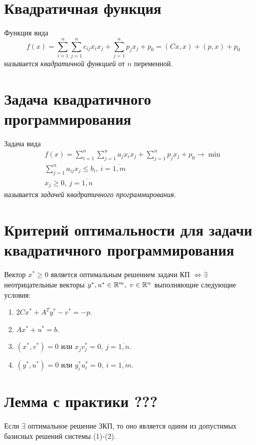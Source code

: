 \section{Квадратичная функция}

\begin{definition}
	Функция вида
	\[
		f(x)=\sum_{i=1}^{n}\sum_{j=1}^{n}c_{ij}x_ix_j + \sum_{j=1}^{n}p_jx_j + p_0 = (Cx,x) + (p,x) + p_0
	\]
	называется \emph{квадратичной функцией} от $n$ переменной.
\end{definition}

\section{Задача квадратичного программирования}

\begin{definition}
	Задача вида
	\[
		\begin{array}{l}
			f(x)=\sum_{i=1}^{n}\sum_{j=1}^{n}a_jx_ix_j + \sum_{j=1}^{n}p_jx_j + p_0 \rightarrow \min \\
			\sum_{j=1}^{n}a_{ij}x_j \leqslant b_i, \ i = \overline{1,m}                              \\
			x_j \geqslant 0, \ j= \overline{1,n}
		\end{array}
	\]
	называется \emph{задачей квадратичного программирования}.
\end{definition}

\section{Критерий оптимальности для задачи квадратичного программирования}

\begin{theorem}
	Вектор $x^* \geqslant 0$ является оптимальным решением задачи КП $\iff \exists $ неотрицательные векторы $y^*,u^* \in \mathbb{R}^m, \ v \in \mathbb{R}^n$ выполняющие следующие условия:
	\begin{enumerate}
		\item $2Cx^* + A^Ty^* - v^* = -p$.
		\item $Ax^* + u^* = b$.
		\item $(x^*,v^*) = 0$ или $x_jv_{j}^{*}=0, \ j=\overline{1,n}$.
		\item $(y^*,u^*)=0$ или $y_{i}^{*}u_{i}^{*}=0, \ i = \overline{1,m}$.
	\end{enumerate}
\end{theorem}

\section{Лемма с практики ???}

\begin{remark}
	Если $\exists $ оптимальное решение ЗКП, то оно является одинм из допустимых базисных решений системы (1)-(2).
\end{remark}
